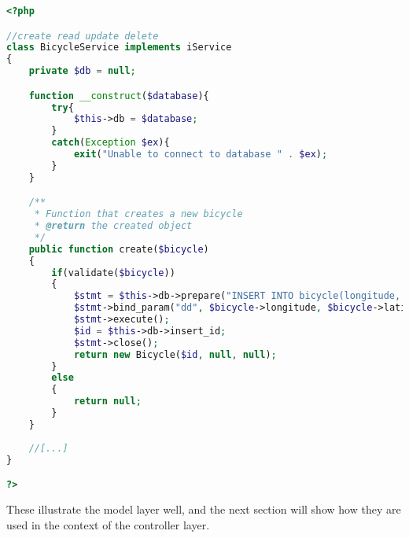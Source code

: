 \begin{lstlisting}[language=php, label=lst:bicycleService, caption={BicycleService Class}]
<?php

//create read update delete
class BicycleService implements iService
{
    private $db = null;

    function __construct($database){
        try{
            $this->db = $database;
        }
        catch(Exception $ex){
            exit("Unable to connect to database " . $ex);
        }
    }

    /**
     * Function that creates a new bicycle
     * @return the created object
     */
    public function create($bicycle)
    {
        if(validate($bicycle))
        {
            $stmt = $this->db->prepare("INSERT INTO bicycle(longitude, latitude) VALUES (?,?)");
            $stmt->bind_param("dd", $bicycle->longitude, $bicycle->latitude);
            $stmt->execute();
            $id = $this->db->insert_id;
            $stmt->close();
            return new Bicycle($id, null, null);
        }
        else
        {
            return null;
        }
    }
    
    //[...]
}

?>
\end{lstlisting}

These illustrate the model layer well, and the next section will show how they are used in the context of the controller layer.